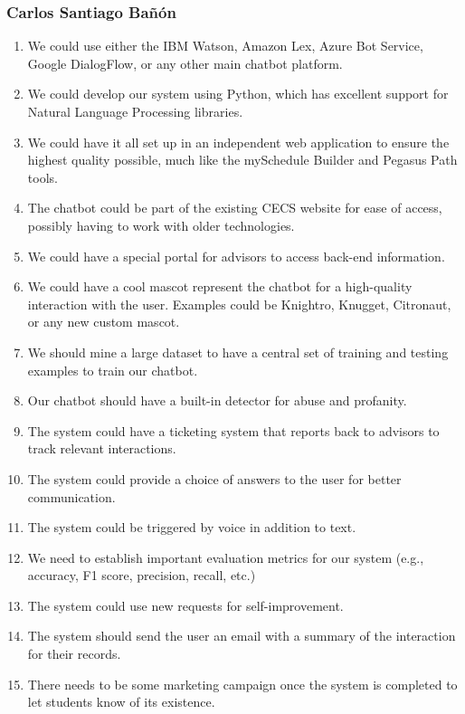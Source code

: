 \documentclass[titlepage, 12pt]{article}
\begin{document}
\subsubsection{Carlos Santiago Bañón}

\begin{enumerate}
    \item We could use either the IBM Watson, Amazon Lex, Azure Bot Service, Google DialogFlow, or any other main chatbot platform.
    \item We could develop our system using Python, which has excellent support for Natural Language Processing libraries.
    \item We could have it all set up in an independent web application to ensure the highest quality possible, much like the mySchedule Builder and Pegasus Path tools.
    \item The chatbot could be part of the existing CECS website for ease of access, possibly having to work with older technologies.
    \item We could have a special portal for advisors to access back-end information.
    \item We could have a cool mascot represent the chatbot for a high-quality interaction with the user. Examples could be Knightro, Knugget, Citronaut, or any new custom mascot.
    \item We should mine a large dataset to have a central set of training and testing examples to train our chatbot.
    \item Our chatbot should have a built-in detector for abuse and profanity.
    \item The system could have a ticketing system that reports back to advisors to track relevant interactions.
    \item The system could provide a choice of answers to the user for better communication.
    \item The system could be triggered by voice in addition to text.
    \item We need to establish important evaluation metrics for our system (e.g., accuracy, F1 score, precision, recall, etc.)
    \item The system could use new requests for self-improvement.
    \item The system should send the user an email with a summary of the interaction for their records.
    \item There needs to be some marketing campaign once the system is completed to let students know of its existence.

\end{enumerate}
\end{document}
